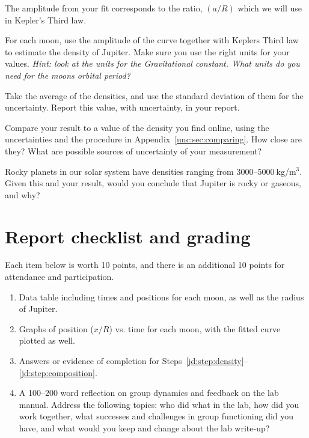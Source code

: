 The amplitude from your fit corresponds to the ratio, $(a/R)$ which we will use in Kepler’s Third law.

\begin{steps}
	\item For each moon, use the amplitude of the curve together with Keplers Third law
	to estimate the density of Jupiter. Make sure you use the right units for your values. \textit{Hint:
	look at the units for the Gravitational constant. What units do you need for the moons
	orbital period?}

	\item\label{jd:step:density} Take the average of the densities, and use the standard deviation of them for the uncertainty. Report this value, with uncertainty, in your report.
	
	\item Compare your result to a value of the density you find online, using the uncertainties and the procedure in Appendix~\ref{unc:sec:comparing}. How close are they? What are possible sources of uncertainty of your measurement?
	
	\item\label{jd:step:composition} Rocky planets in our solar system have densities ranging from 3000--5000$\:$kg/m$^3$. Given this and your result, would you conclude that Jupiter is rocky or gaseous, and why?
\end{steps}

\section{Report checklist and grading}

Each item below is worth 10 points, and there is an additional 10 points for attendance and participation.

\begin{enumerate}
	\item Data table including times and positions for each moon, as well as the radius of Jupiter.
	
	\item Graphs of position ($x/R$) vs. time for each moon, with the fitted curve plotted as well.
	
	\item Answers or evidence of completion for Steps~\ref{jd:step:density}--\ref{jd:step:composition}.
	
	\item A 100--200 word reflection on group dynamics and feedback on the lab manual. Address the following topics: who did what in the lab, how did you work together, what successes and challenges in group functioning did you have, and what would you keep and change about the lab write-up?
	
\end{enumerate}